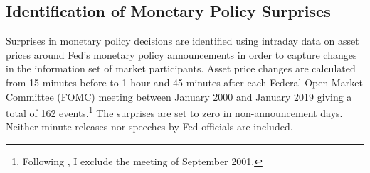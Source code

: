 {\subsection{Identification of Monetary Policy Surprises} \label{sec:USMPS}
\iftoggle{toclinks}{\gototoc}{} %


Surprises in monetary policy decisions are identified using intraday data on asset prices around Fed's monetary policy announcements in order to capture changes in the information set of market participants. %
Asset price changes are calculated from 15 minutes before to 1 hour and 45 minutes after each Federal Open Market Committee (FOMC) meeting between January 2000 and January 2019 giving a total of 162 events.\footnote{ Following \cite{GSS:2005a}, I exclude the meeting of September 2001.} %
The surprises are set to zero in non-announcement days. %
Neither minute releases nor speeches by Fed officials are included. 

}
